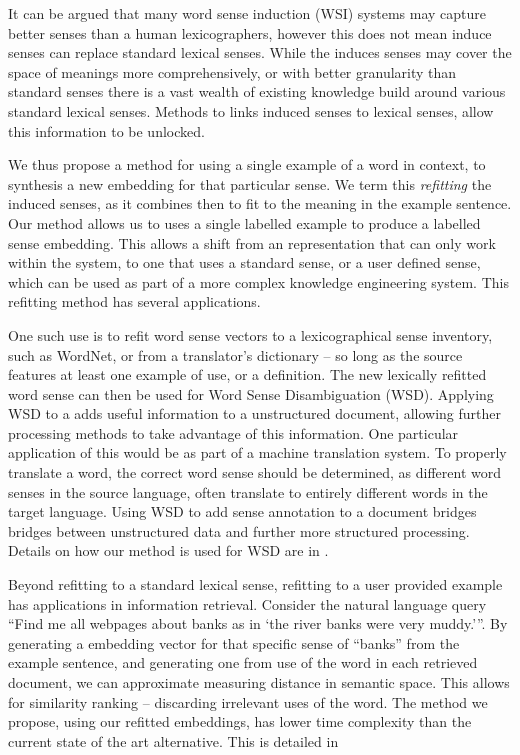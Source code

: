 \documentclass{sig-alternate}
\begin{document}
It can be argued that many word sense induction (WSI) systems may capture better senses than a human lexicographers, however this does not mean induce senses can replace standard lexical senses. While the induces senses may cover the space of meanings more comprehensively, or with better granularity than standard senses there is a vast wealth of existing knowledge build around various standard lexical senses. Methods to links induced senses to lexical senses, allow this information to be unlocked.

We thus propose a method for using a single example of a word in context, to synthesis a new embedding for that particular sense. We term this \emph{refitting} the induced senses, as it combines then to fit to the meaning in the example sentence. Our method allows us to uses a single labelled example to produce a labelled sense embedding. This allows a shift from an representation that can only work within the system, to one that uses a standard sense, or a user defined sense, which can be used as part of a more complex knowledge engineering system. This refitting method  has several applications.


One such use is to refit word sense vectors to a lexicographical sense inventory, such as WordNet, or from a translator's dictionary -- so long as the source features at least one example of use, or a definition. The new lexically refitted word sense can then be used for Word Sense Disambiguation (WSD). Applying WSD to a adds useful information to a unstructured document, allowing further processing methods to take advantage of this information. One particular application of this would be as part of a machine translation system. To properly translate a word, the correct word sense should be determined, as different word senses in the source language, often translate to entirely different words in the target language. Using WSD to add sense annotation to a document bridges bridges between unstructured data and further more structured processing.
Details on how our method is used for WSD are in .

Beyond refitting to a standard lexical sense, refitting to a user provided example has applications in information retrieval. Consider the natural language query \enquote{Find me all webpages about banks as in \enquote{the river banks were very muddy.}}. By generating a embedding vector for that specific sense of ``banks'' from the example sentence, and generating one from use of the word in each retrieved document, we can approximate measuring distance in semantic space. This allows for similarity ranking -- discarding irrelevant uses of the word. The method we propose, using our refitted embeddings, has lower time complexity than the current state of the art alternative. This is detailed in 
\end{document}
